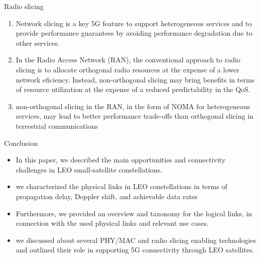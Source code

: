 \documentclass{beamer}
\begin{document}
\begin{frame}
  \begin{block}{Radio slicing}
\begin{enumerate}
    \item Network slicing  is a key 5G feature to support heterogeneous services and to
provide performance guarantees by avoiding performance
degradation due to other services.
\item In the Radio Access Network
(RAN), the conventional approach to radio slicing
is to allocate orthogonal radio resources at the expense of
a lower network eficiency. Instead, non-orthogonal slicing
may bring benefits in terms of resource utilization at the
expense of a reduced predictability in the QoS.
\item  non-orthogonal slicing in the RAN, in the form of NOMA
for heterogeneous services, may lead to better performance
trade-offs than orthogonal slicing in terrestrial communications
\end{enumerate}
\end{block}  
\end{frame}
\begin{frame}
\begin{block}{Conclusion}
\begin{itemize}
    \item In this paper, we described the main opportunities and
connectivity challenges in LEO small-satellite constellations.
\item we characterized the physical links in LEO constellations
in terms of propagation delay, Doppler shift, and
achievable data rates
\item Furthermore, we provided an overview and taxonomy for
the logical links, in connection with the used physical links
and relevant use cases.
\item we discussed about several
PHY/MAC and radio slicing enabling technologies and outlined
their role in supporting 5G connectivity through LEO
satellites.
    
\end{itemize}
\end{block}
\end{frame}
\end{document}
